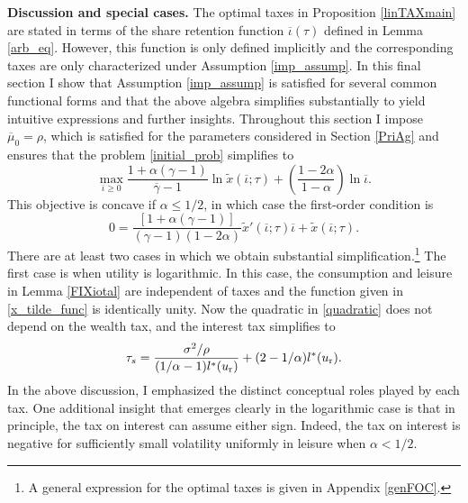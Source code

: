 \documentclass[11pt]{article}
\theoremstyle{plain}
\begin{document}
\textbf{Discussion and special cases.} The optimal taxes in Proposition \ref{linTAXmain} are stated in terms of the share retention function $\overline{\iota}(\tau)$ defined in Lemma \ref{arb_eq}. However, this function is only defined implicitly and the corresponding taxes are only characterized under Assumption \ref{imp_assump}. In this final section I show that Assumption \ref{imp_assump} is satisfied for several common functional forms and that the above algebra simplifies substantially to yield intuitive expressions and further insights. Throughout this section I impose $\overline{\mu}_0 = \rho$, which is satisfied for the parameters considered in Section \ref{PriAg} and ensures that the problem \eqref{initial_prob} simplifies to 
\begin{equation} %
\max_{\overline{\iota} \geq 0} \frac{1 + \alpha(\gamma-1)}{\overline{\gamma}-1}\ln \tilde{x}(\overline{\iota};\tau) + {\left(\frac{1 - 2\alpha}{1 - \alpha}\right)} \ln \overline{\iota}.
\label{initial_prob_simp}
\end{equation}
This objective is concave if $\alpha \leq 1/2$, in which case the first-order condition is
\begin{equation}
0 = \frac{[1 + \alpha(\gamma-1)]}{(\gamma-1)(1 - 2\alpha)}\tilde{x}'(\overline{\iota};\tau)\overline{\iota} + \tilde{x}(\overline{\iota};\tau).
\label{quadratic}
\end{equation}
There are at least two cases in which we obtain substantial simplification.\footnote{A general expression for the optimal taxes is given in Appendix \ref{genFOC}.} The first case is when utility is logarithmic. In this case, the consumption and leisure in Lemma \ref{FIXiotal} are independent of taxes and the function given in \eqref{x_tilde_func} is identically unity. Now the quadratic in \eqref{quadratic} does not depend on the wealth tax, and the interest tax simplifies to 
\begin{equation}
\tau_s = \frac{\sigma^2/\rho}{(1/\alpha-1)l^*(u_{\textnormal{r}})} + (2 - 1/\alpha)l^*(u_{\textnormal{r}}).
\label{log_system}
\end{equation}
In the above discussion, I emphasized the distinct conceptual roles played by each tax. One additional insight that emerges clearly in the logarithmic case is that in principle, the tax on interest can assume either sign. Indeed, the tax on interest is negative for sufficiently small volatility uniformly in leisure when $\alpha < 1/2$. 
\end{document}
